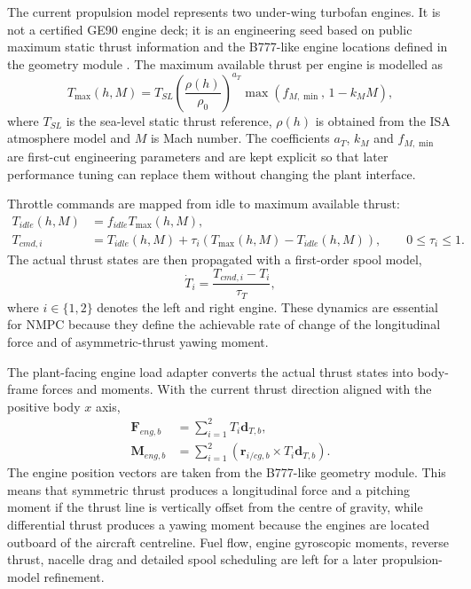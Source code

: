 The current propulsion model represents two under-wing turbofan engines. It is
not a certified GE90 engine deck; it is an engineering seed based on public
maximum static thrust information and the B777-like engine locations defined in
the geometry module \cite{ge90}. The maximum available thrust per engine is modelled as
\begin{equation}
    T_{\max}(h,M) =
    T_{SL}
    \left(\frac{\rho(h)}{\rho_0}\right)^{a_T}
    \max\left(f_{M,\min},\, 1-k_M M\right),
\end{equation}
where $T_{SL}$ is the sea-level static thrust reference, $\rho(h)$ is obtained
from the ISA atmosphere model and $M$ is Mach number. The coefficients
$a_T$, $k_M$ and $f_{M,\min}$ are first-cut engineering parameters and are
kept explicit so that later performance tuning can replace them without
changing the plant interface.

Throttle commands are mapped from idle to maximum available thrust:
\begin{align}
    T_{idle}(h,M) &= f_{idle} T_{\max}(h,M), \\
    T_{cmd,i} &=
        T_{idle}(h,M)
        + \tau_i\left(T_{\max}(h,M)-T_{idle}(h,M)\right),
        \qquad 0 \leq \tau_i \leq 1 .
\end{align}
The actual thrust states are then propagated with a first-order spool model,
\begin{equation}
    \dot{T}_i = \frac{T_{cmd,i}-T_i}{\tau_T},
\end{equation}
where $i \in \{1,2\}$ denotes the left and right engine. These dynamics are
essential for NMPC because they define the achievable rate of change of the
longitudinal force and of asymmetric-thrust yawing moment.

The plant-facing engine load adapter converts the actual thrust states into
body-frame forces and moments. With the current thrust direction aligned with
the positive body $x$ axis,
\begin{align}
    \bm{F}_{eng,b} &=
        \sum_{i=1}^{2} T_i \bm{d}_{T,b}, \\
    \bm{M}_{eng,b} &=
        \sum_{i=1}^{2}
        \left(\bm{r}_{i/cg,b} \times T_i \bm{d}_{T,b}\right).
\end{align}
The engine position vectors are taken from the B777-like geometry module. This
means that symmetric thrust produces a longitudinal force and a pitching moment
if the thrust line is vertically offset from the centre of gravity, while
differential thrust produces a yawing moment because the engines are located
outboard of the aircraft centreline. Fuel flow, engine gyroscopic moments,
reverse thrust, nacelle drag and detailed spool scheduling are left for a later
propulsion-model refinement.

